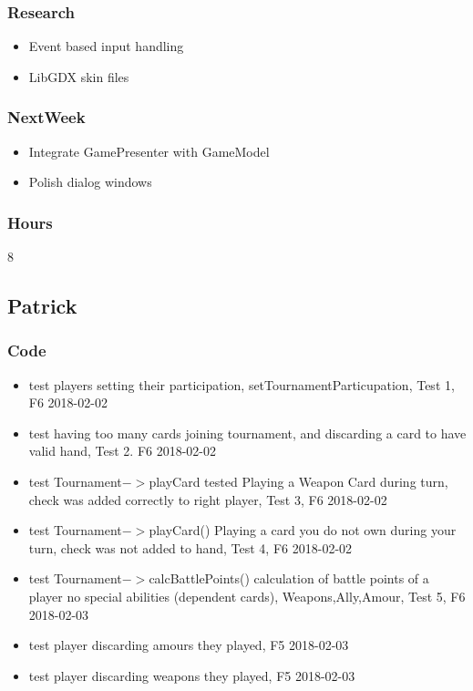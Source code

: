 \documentclass[10pt,a4paper]{article}
\begin{document}
\subsubsection*{Research}
\begin{itemize}
\item Event based input handling
\item LibGDX skin files
\end{itemize}
\subsubsection*{NextWeek}
\begin{itemize}
\item Integrate GamePresenter with GameModel
\item Polish dialog windows
\end{itemize}
\subsubsection*{Hours}
8

\newpage
\subsection*{Patrick}

\subsubsection*{Code}
\begin{itemize}
\item test players setting their participation, setTournamentParticupation, Test 1, F6 2018-02-02
\item test having too many cards joining tournament, and discarding a card to have valid hand, Test 2. F6 2018-02-02
\item test Tournament$->$playCard tested Playing a Weapon Card during turn, check was added correctly to right player, Test 3, F6 2018-02-02
\item test Tournament$->$playCard() Playing a card you do not own during your turn, check was not added to hand, Test 4, F6 2018-02-02
\item test Tournament$->$calcBattlePoints() calculation of battle points of a player no special abilities (dependent cards), Weapons,Ally,Amour, Test 5, F6 2018-02-03
\item test player discarding amours they played, F5 2018-02-03
\item test player discarding weapons they played, F5 2018-02-03
\end{itemize}
\end{document}
